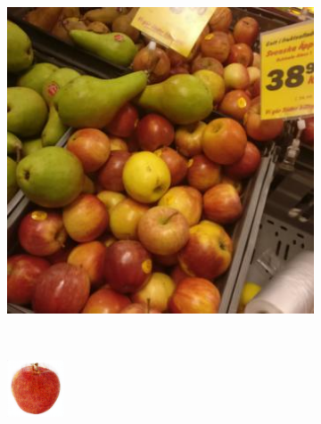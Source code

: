\begin{figure}[t]
	\centering
	\begin{subfigure}[b]{0.18\textwidth}
		\centering
		\includegraphics[width=\textwidth]{PaperA/decoded-image-figure/Royal-Gala-Apple_003.jpg}
		\caption{}
		\label{subfig:royal-gala-natural}
	\end{subfigure} ~
	\begin{subfigure}[b]{0.18\textwidth}
		\centering
		\includegraphics[width=\textwidth]{PaperA/decoded-image-figure/densenet_nov11/Royal-Gala-Apple_decoded.png}

\end{subfigure}
\end{figure}

